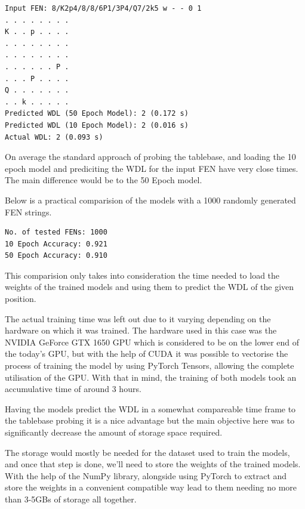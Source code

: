 \begin{lstlisting}[caption= Example comparing output of both models to Syzygy 6-man Tablebase]
Input FEN: 8/K2p4/8/8/6P1/3P4/Q7/2k5 w - - 0 1
. . . . . . . .
K . . p . . . .
. . . . . . . .
. . . . . . . .
. . . . . . P .
. . . P . . . .
Q . . . . . . .
. . k . . . . .
Predicted WDL (50 Epoch Model): 2 (0.172 s)
Predicted WDL (10 Epoch Model): 2 (0.016 s)
Actual WDL: 2 (0.093 s)
\end{lstlisting}

On average the standard approach of probing the tablebase, and loading the 10 epoch model and prediciting the WDL for the input FEN have very close times. The main difference would be to the 50 Epoch model.

Below is a practical comparision of the models with a 1000 randomly generated FEN strings.

\begin{lstlisting}[caption=Practical comparision of accuracy between models]
No. of tested FENs: 1000
10 Epoch Accuracy: 0.921
50 Epoch Accuracy: 0.910
\end{lstlisting}

This comparision only takes into consideration the time needed to load the weights of the trained models and using them to predict the WDL of the given position.

The actual training time was left out due to it varying depending on the hardware on which it was trained. The hardware used in this case was the NVIDIA GeForce GTX 1650 GPU which is considered to be on the lower end of the today's GPU, but with the help of CUDA\cite{Cuda} it was possible to vectorise the process of training the model by using PyTorch Tensors\cite{PyTorchtensors}, allowing the complete utilisation of the GPU. With that in mind, the training of both models took an accumulative time of around 3 hours.

Having the models predict the WDL in a somewhat compareable time frame to the tablebase probing it is a nice advantage but the main objective here was to significantly decrease the amount of storage space required.

The storage would mostly be needed for the dataset used to train the models, and once that step is done, we'll need to store the weights of the trained models. With the help of the NumPy library, alongside using PyTorch to extract and store the weights in a convenient compatible way lead to them needing no more than 3-5GBs of storage all together.

